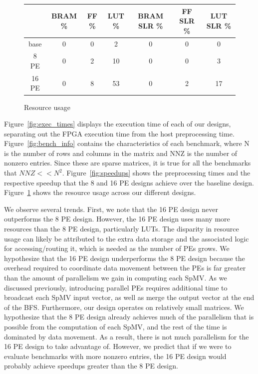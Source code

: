 \documentclass[10pt]{article}
\begin{document}
\begin{figure}[h!]
  \centering
  \begin{tabular} {| c | c | c | c | c | c | c |}
    \hline
          & BRAM \% & FF \% & LUT \% & BRAM SLR \% & FF SLR \% & LUT SLR \% \\
    \hline
    base  & 0 & 0 & 2 & 0 & 0 & 0 \\
    \hline
    8 PE  & 0 & 2 & 10 & 0 & 0 & 3 \\
    \hline
    16 PE & 0 & 8 & 53 & 0 & 2 & 17 \\
    \hline
  \end{tabular}
  \caption{Resource usage}
  \label{fig:resources}
\end{figure}

\noindent Figure~\ref{fig:exec_times} displays the execution time of each of our designs, separating out the FPGA execution time from
the host preprocessing time. Figure~\ref{fig:bench_info} contains the characteristics of each benchmark, where N is the number of
rows and columns in the matrix and NNZ is the number of nonzero entries. Since these are sparse matrices, it is true for all the
benchmarks that $\mathit{NNZ} << N^2$. Figure~\ref{fig:speedups} shows the preprocessing times and the respective speedup that the 8 and 
16 PE designs achieve over the baseline design. Figure~\ref{fig:resources} shows the resource usage across our different designs.\newline

\noindent We observe several trends. First, we note that the 16 PE design never outperforms the 8 PE design. However, the 16 PE design
uses many more resources than the 8 PE design, particularly LUTs. The disparity in resource usage can likely be attributed to
the extra data storage and the associated logic for accessing/routing it, which is needed as the number of PEs grows. We hypothesize
that the 16 PE design underperforms the 8 PE design because the overhead required to coordinate data movement between the PEs is far
greater than the amount of parallelism we gain in computing each SpMV. As we discussed previously, introducing parallel PEs requires
additional time to broadcast each SpMV input vector, as well as merge the output vector at the end of the BFS. Furthermore, our
design operates on relatively small matrices. We hypothesize that the 8 PE design already achieves much of the parallelism that is
possible from the computation of each SpMV, and the rest of the time is dominated by data movement. As a result, there is not
much parallelism for the 16 PE design to take advantage of. However, we predict that if we were to evaluate benchmarks with more
nonzero entries, the 16 PE design would probably achieve speedups greater than the 8 PE design.\newline
\end{document}
